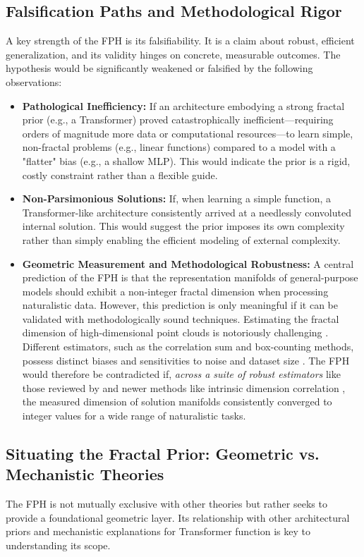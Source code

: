 \documentclass[11pt,a4paper]{article}
\begin{document}
\subsection{Falsification Paths and Methodological Rigor}
A key strength of the FPH is its falsifiability. It is a claim about robust, efficient generalization, and its validity hinges on concrete, measurable outcomes. The hypothesis would be significantly weakened or falsified by the following observations:
\begin{itemize}
    \item \textbf{Pathological Inefficiency:} If an architecture embodying a strong fractal prior (e.g., a Transformer) proved catastrophically inefficient—requiring orders of magnitude more data or computational resources—to learn simple, non-fractal problems (e.g., linear functions) compared to a model with a "flatter" bias (e.g., a shallow MLP). This would indicate the prior is a rigid, costly constraint rather than a flexible guide.
    
    \item \textbf{Non-Parsimonious Solutions:} If, when learning a simple function, a Transformer-like architecture consistently arrived at a needlessly convoluted internal solution. This would suggest the prior imposes its own complexity rather than simply enabling the efficient modeling of external complexity.
    
    \item \textbf{Geometric Measurement and Methodological Robustness:} A central prediction of the FPH is that the representation manifolds of general-purpose models should exhibit a non-integer fractal dimension when processing naturalistic data. However, this prediction is only meaningful if it can be validated with methodologically sound techniques. Estimating the fractal dimension of high-dimensional point clouds is notoriously challenging \citep{fass2023estimating}. Different estimators, such as the correlation sum and box-counting methods, possess distinct biases and sensitivities to noise and dataset size \citep{fass2023estimating}. The FPH would therefore be contradicted if, \textit{across a suite of robust estimators} like those reviewed by \cite{fass2023estimating} and newer methods like intrinsic dimension correlation \citep{ansuini2023intrinsic}, the measured dimension of solution manifolds consistently converged to integer values for a wide range of naturalistic tasks.
\end{itemize}

\subsection{Situating the Fractal Prior: Geometric vs. Mechanistic Theories}
The FPH is not mutually exclusive with other theories but rather seeks to provide a foundational geometric layer. Its relationship with other architectural priors and mechanistic explanations for Transformer function is key to understanding its scope.
\end{document}
